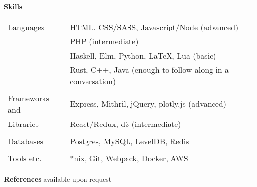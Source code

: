 \documentclass[notitlepage,oneside,draft]{article}
\begin{document}
\begin{flushleft}
  \large
  \textbf{Skills} \\
  \vspace{12pt}
  \normalsize
  \begin{tabular}{ p{86pt} | l  }
    Languages & HTML, CSS/SASS, Javascript/Node (advanced) \\
    & PHP (intermediate) \\
    & Haskell, Elm, Python, LaTeX, Lua (basic) \\
    & Rust, C++, Java (enough to follow along in a conversation) \\
    & \\
    Frameworks and & Express, Mithril, jQuery, plotly.js (advanced) \\
    Libraries & React/Redux, d3 (intermediate) \\
    & \\
    Databases & Postgres, MySQL, LevelDB, Redis \\
    & \\
    Tools etc. & *nix, Git, Webpack, Docker, AWS
  \end{tabular}
  \vspace{24pt}


  \large
  \textbf{References}
  \normalsize
  available upon request

\end{flushleft}
\end{document}
